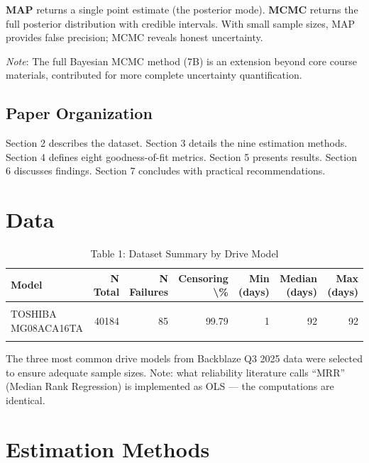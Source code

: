 \documentclass[
]{article}
\begin{document}
\textbf{MAP} returns a single point estimate (the posterior mode).
\textbf{MCMC} returns the full posterior distribution with credible
intervals. With small sample sizes, MAP provides false precision; MCMC
reveals honest uncertainty.

\emph{Note}: The full Bayesian MCMC method (7B) is an extension beyond
core course materials, contributed for more complete uncertainty
quantification.

\subsection{Paper Organization}\label{paper-organization}

Section 2 describes the dataset. Section 3 details the nine estimation
methods. Section 4 defines eight goodness-of-fit metrics. Section 5
presents results. Section 6 discusses findings. Section 7 concludes with
practical recommendations.

\section{Data}\label{data}

\begin{longtable}[t]{lrrrrrr}
\caption{\label{tab:table-1-data}Table 1: Dataset Summary by Drive Model}\\
\toprule
Model & N Total & N Failures & Censoring \textbackslash{}\% & Min (days) & Median (days) & Max (days)\\
\midrule
\cellcolor{gray!10}{TOSHIBA MG07ACA14TA} & \cellcolor{gray!10}{37463} & \cellcolor{gray!10}{116} & \cellcolor{gray!10}{99.69} & \cellcolor{gray!10}{1} & \cellcolor{gray!10}{92} & \cellcolor{gray!10}{92}\\
TOSHIBA MG08ACA16TA & 40184 & 85 & 99.79 & 1 & 92 & 92\\
\cellcolor{gray!10}{WDC WUH722222ALE6L4} & \cellcolor{gray!10}{40271} & \cellcolor{gray!10}{50} & \cellcolor{gray!10}{99.88} & \cellcolor{gray!10}{1} & \cellcolor{gray!10}{92} & \cellcolor{gray!10}{92}\\
\bottomrule
\end{longtable}

The three most common drive models from Backblaze Q3 2025 data were
selected to ensure adequate sample sizes. Note: what reliability
literature calls ``MRR'' (Median Rank Regression) is implemented as OLS
--- the computations are identical.

\section{Estimation Methods}\label{estimation-methods}
\end{document}
